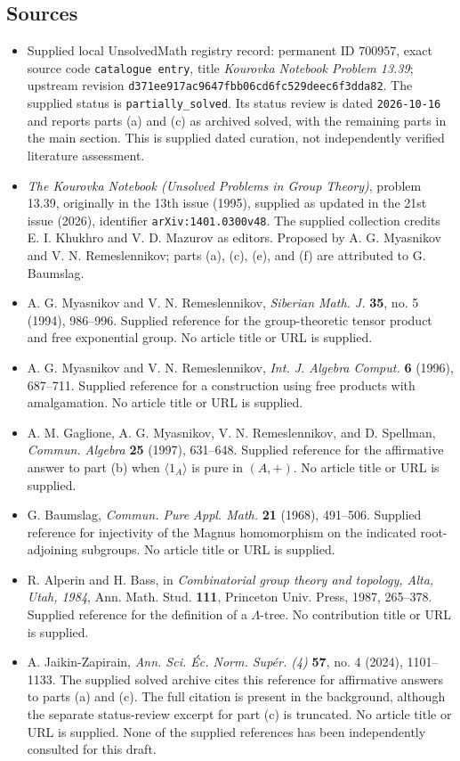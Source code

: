 \documentclass[11pt]{article}
\begin{document}
\subsection{Sources}
\begin{itemize}
\item Supplied local UnsolvedMath registry record: permanent ID \(700957\), exact source code \texttt{catalogue entry}, title \emph{Kourovka Notebook Problem 13.39}; upstream revision \texttt{d371ee917ac9647fbb06cd6fc529deec6f3dda82}. The supplied status is \texttt{partially\_solved}. Its status review is dated \texttt{2026-10-16} and reports parts (a) and (c) as archived solved, with the remaining parts in the main section. This is supplied dated curation, not independently verified literature assessment.
\item \emph{The Kourovka Notebook (Unsolved Problems in Group Theory)}, problem 13.39, originally in the 13th issue (1995), supplied as updated in the 21st issue (2026), identifier \texttt{arXiv:1401.0300v48}. The supplied collection credits E. I. Khukhro and V. D. Mazurov as editors. Proposed by A. G. Myasnikov and V. N. Remeslennikov; parts (a), (c), (e), and (f) are attributed to G. Baumslag.
\item A. G. Myasnikov and V. N. Remeslennikov, \emph{Siberian Math. J.} \textbf{35}, no. 5 (1994), 986--996. Supplied reference for the group-theoretic tensor product and free exponential group. No article title or URL is supplied.
\item A. G. Myasnikov and V. N. Remeslennikov, \emph{Int. J. Algebra Comput.} \textbf{6} (1996), 687--711. Supplied reference for a construction using free products with amalgamation. No article title or URL is supplied.
\item A. M. Gaglione, A. G. Myasnikov, V. N. Remeslennikov, and D. Spellman, \emph{Commun. Algebra} \textbf{25} (1997), 631--648. Supplied reference for the affirmative answer to part (b) when \(\langle1_A\rangle\) is pure in \((A,+)\). No article title or URL is supplied.
\item G. Baumslag, \emph{Commun. Pure Appl. Math.} \textbf{21} (1968), 491--506. Supplied reference for injectivity of the Magnus homomorphism on the indicated root-adjoining subgroups. No article title or URL is supplied.
\item R. Alperin and H. Bass, in \emph{Combinatorial group theory and topology, Alta, Utah, 1984}, Ann. Math. Stud. \textbf{111}, Princeton Univ. Press, 1987, 265--378. Supplied reference for the definition of a \(\Lambda\)-tree. No contribution title or URL is supplied.
\item A. Jaikin-Zapirain, \emph{Ann. Sci. \'Ec. Norm. Sup\'er. (4)} \textbf{57}, no. 4 (2024), 1101--1133. The supplied solved archive cites this reference for affirmative answers to parts (a) and (c). The full citation is present in the background, although the separate status-review excerpt for part (c) is truncated. No article title or URL is supplied. None of the supplied references has been independently consulted for this draft.
\end{itemize}
\end{document}
